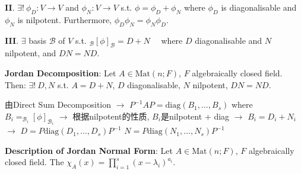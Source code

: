\documentclass[9pt]{article}
\begin{document}
\textbf{II}. $\exists! \ \phi_D:V\to V$ and $\phi_N:V\to V$ s.t. $\phi=\phi_D+\phi_N$ where $\phi_D$ is diagonalisable and $\phi_N$ is nilpotent. \quad Furthermore, $\phi_D\phi_N=\phi_N\phi_D$.

\textbf{III}. $\exists$ basis $\mathcal{B}$ of $V$ s.t. $_{\mathcal{B}}[{\phi}]_{\mathcal{B}}=D+N$ \ \ where $D$ diagonalisable and $N$ nilpotent, and $DN=ND$.


{\footnotesize \np\textbf{Jordan Decomposition}: Let $A\in\text{Mat}(n;F)$, $F$ algebraically closed field. \quad Then: $\exists! \ D, N$ s.t. $A=D+N$, $D$ diagonalisable, $N$ nilpotent, $DN=ND$.}

{\tiny 由Direct Sum Decomposition $\rightarrow$ $P^{-1}AP=\text{diag}(B_1,...,B_s)$ where $B_i=_{{\mathcal{B}_i}}[\phi]_{{\mathcal{B}_i}}$ $\rightarrow$ 根据nilpotent的性质, $B_i$是nilpotent + diag $\rightarrow$ $B_i=D_i+N_i$ $\rightarrow$ $D=P\text{diag}(D_1,...,D_s)P^{-1}$ $N=P\text{diag}(N_1,...,N_s)P^{-1}$}

\textbf{Description of Jordan Normal Form}: Let $A\in\text{Mat}(n;F)$, $F$ algebraically closed field. The $\chi_A(x)=\prod_{i=1}^s(x-\lambda_i)^{a_i}$.
\end{document}
